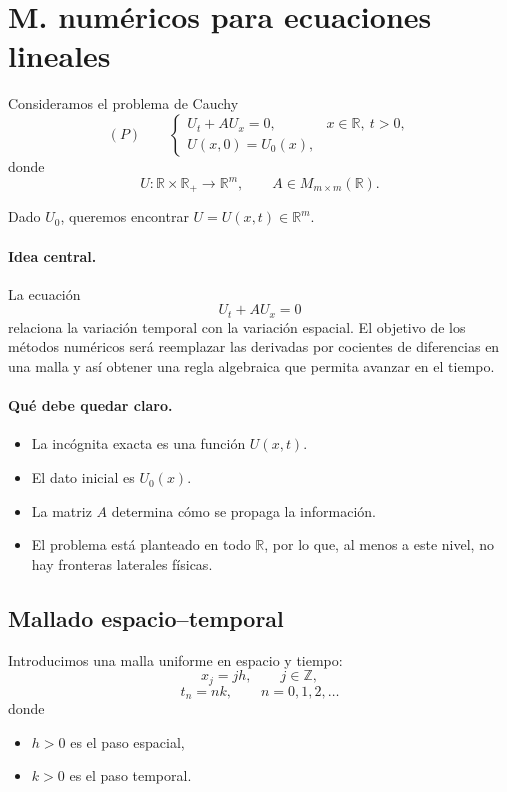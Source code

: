 
\section{M. numéricos para ecuaciones lineales}

Consideramos el problema de Cauchy
\[
(P)\qquad
\begin{cases}
U_t + A U_x = 0, & x \in \mathbb{R},\ t>0,\\[4pt]
U(x,0)=U_0(x),
\end{cases}
\]
donde
\[
U:\mathbb{R}\times \mathbb{R}_+ \to \mathbb{R}^m,
\qquad
A\in M_{m\times m}(\mathbb{R}).
\]

Dado \(U_0\), queremos encontrar \(U=U(x,t)\in \mathbb{R}^m\).

\paragraph{Idea central.}
La ecuación
\[
U_t + A U_x = 0
\]
relaciona la variación temporal con la variación espacial. El objetivo de los métodos numéricos será reemplazar las derivadas por cocientes de diferencias en una malla y así obtener una regla algebraica que permita avanzar en el tiempo.

\paragraph{Qué debe quedar claro.}
\begin{itemize}
    \item La incógnita exacta es una función \(U(x,t)\).
    \item El dato inicial es \(U_0(x)\).
    \item La matriz \(A\) determina cómo se propaga la información.
    \item El problema está planteado en todo \(\mathbb{R}\), por lo que, al menos a este nivel, no hay fronteras laterales físicas.
\end{itemize}

\subsection{Mallado espacio--temporal}

Introducimos una malla uniforme en espacio y tiempo:
\[
x_j = jh, \qquad j\in \mathbb{Z},
\]
\[
t_n = nk, \qquad n=0,1,2,\dots
\]
donde
\begin{itemize}
    \item \(h>0\) es el paso espacial,
    \item \(k>0\) es el paso temporal.
\end{itemize}

